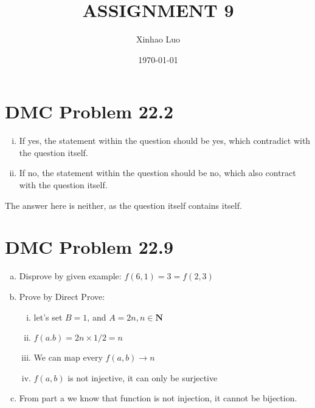 \documentclass{article}
\title{\bf \Large ASSIGNMENT 9}
\author{Xinhao Luo}
\date{\today}
\def\math#1{$#1$}
\begin{document}
\maketitle
\medskip

\section{DMC Problem 22.2}
\begin{enumerate}[i)]
    \item If yes, the statement within the question should be yes, which contradict with the question itself.
    \item If no, the statement within the question should be no, which also contract with the question itself.
\end{enumerate}

The answer here is neither, as the question itself contains itself.

\section{DMC Problem 22.9}
\begin{enumerate}[a)]
    \item Disprove by given example: \math{f(6, 1) = 3 = f(2, 3)}
    \item Prove by Direct Prove: 
        \begin{enumerate}[i)]
            \item let's set \math{B = 1}, and \math{A = 2n, n \in \mathbf{N}}
            \item \math{f(a. b) = 2n \times 1 / 2 = n}
            \item We can map every \math{f(a, b) \to n}
            \item \math{f(a, b)} is not injective, it can only be surjective
        \end{enumerate}
    \item From part a we know that function is not injection, it cannot be bijection.
\end{enumerate}
\end{document}
